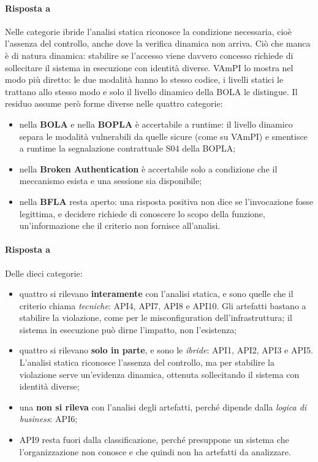 \paragraph{Risposta a }
Nelle categorie ibride l'analisi statica riconosce la condizione necessaria,
cioè l'assenza del controllo, anche dove la verifica dinamica non arriva. Ciò
che manca è di natura dinamica: stabilire se l'accesso viene davvero concesso
richiede di sollecitare il sistema in esecuzione con identità diverse. VAmPI
lo mostra nel modo più diretto: le due modalità hanno lo stesso codice, i
livelli statici le trattano allo stesso modo e solo il livello dinamico della
BOLA le distingue. Il residuo assume però forme diverse nelle quattro
categorie:
\begin{itemize}
  \item nella \textbf{BOLA} e nella \textbf{BOPLA} è accertabile a runtime: il
    livello dinamico separa le modalità vulnerabili da quelle sicure (come su VAmPI)
    e smentisce a runtime la segnalazione contrattuale S04 della BOPLA;
  \item nella \textbf{Broken Authentication} è accertabile solo a condizione
    che il meccanismo esista e una sessione sia disponibile;
  \item nella \textbf{BFLA} resta aperto: una risposta positiva non dice se
    l'invocazione fosse legittima, e decidere richiede di conoscere lo scopo
    della funzione, un'informazione che il criterio non fornisce all'analisi.
\end{itemize}

\paragraph{Risposta a }
Delle dieci categorie:
\begin{itemize}
  \item quattro si rilevano \textbf{interamente} con l'analisi statica, e sono
    quelle che il criterio chiama \emph{tecniche}: API4, API7, API8 e API10.
    Gli artefatti bastano a stabilire la violazione, come per le
    misconfiguration dell'infrastruttura; il sistema in esecuzione può dirne
    l'impatto, non l'esistenza;
  \item quattro si rilevano \textbf{solo in parte}, e sono le \emph{ibride}:
    API1, API2, API3 e API5. L'analisi statica riconosce l'assenza del
    controllo, ma per stabilire la violazione serve un'evidenza dinamica,
    ottenuta sollecitando il sistema con identità diverse;
  \item una \textbf{non si rileva} con l'analisi degli artefatti, perché
    dipende dalla \emph{logica di business}: API6;
  \item API9 resta fuori dalla classificazione, perché presuppone un sistema
    che l'organizzazione non conosce e che quindi non ha artefatti da
    analizzare.
\end{itemize}

